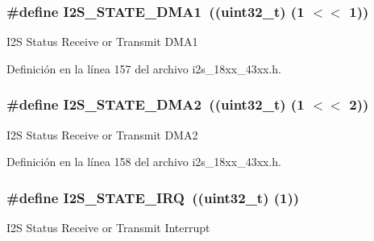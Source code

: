 \subsubsection[{\texorpdfstring{I2\+S\+\_\+\+S\+T\+A\+T\+E\+\_\+\+D\+M\+A1}{I2S_STATE_DMA1}}]{\setlength{\rightskip}{0pt plus 5cm}\#define I2\+S\+\_\+\+S\+T\+A\+T\+E\+\_\+\+D\+M\+A1~((uint32\+\_\+t) (1 $<$$<$ 1))}\hypertarget{group___i2_s__18_x_x__43_x_x_ga0e9a701addd279db953ca34d56487dbd}{}\label{group___i2_s__18_x_x__43_x_x_ga0e9a701addd279db953ca34d56487dbd}
I2S Status Receive or Transmit D\+M\+A1 

Definición en la línea 157 del archivo i2s\+\_\+18xx\+\_\+43xx.\+h.

\subsubsection[{\texorpdfstring{I2\+S\+\_\+\+S\+T\+A\+T\+E\+\_\+\+D\+M\+A2}{I2S_STATE_DMA2}}]{\setlength{\rightskip}{0pt plus 5cm}\#define I2\+S\+\_\+\+S\+T\+A\+T\+E\+\_\+\+D\+M\+A2~((uint32\+\_\+t) (1 $<$$<$ 2))}\hypertarget{group___i2_s__18_x_x__43_x_x_ga84dfa37fbee79986ec79f4d856b8df24}{}\label{group___i2_s__18_x_x__43_x_x_ga84dfa37fbee79986ec79f4d856b8df24}
I2S Status Receive or Transmit D\+M\+A2 

Definición en la línea 158 del archivo i2s\+\_\+18xx\+\_\+43xx.\+h.

\subsubsection[{\texorpdfstring{I2\+S\+\_\+\+S\+T\+A\+T\+E\+\_\+\+I\+RQ}{I2S_STATE_IRQ}}]{\setlength{\rightskip}{0pt plus 5cm}\#define I2\+S\+\_\+\+S\+T\+A\+T\+E\+\_\+\+I\+RQ~((uint32\+\_\+t) (1))}\hypertarget{group___i2_s__18_x_x__43_x_x_gaa412bd295235fcd4d7f0ad284d9386de}{}\label{group___i2_s__18_x_x__43_x_x_gaa412bd295235fcd4d7f0ad284d9386de}
I2S Status Receive or Transmit Interrupt 

